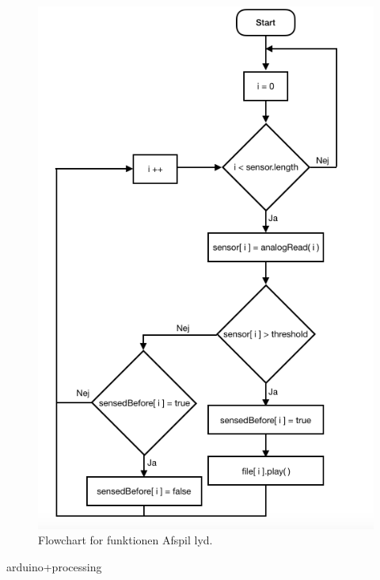 \begin{figure}
\centering
\includegraphics[scale=0.4]{Figure/protoFlowChart02.png}
\caption{
Flowchart for funktionen Afspil lyd. }
\label{fig:protoFlowChart02.png}
\end{figure}


arduino+processing 